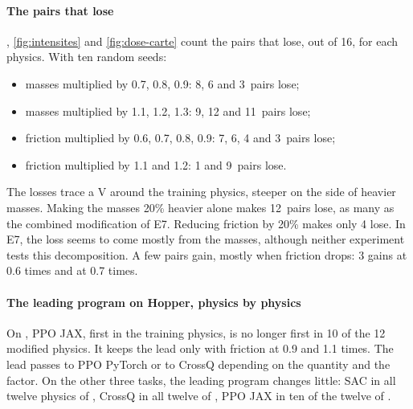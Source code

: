 \paragraph{The pairs that lose}
, \cref{fig:intensites} and \cref{fig:dose-carte} count the pairs that lose, out of 16, for each
physics. With ten random seeds:
\begin{itemize}
  \item masses multiplied by 0.7, 0.8, 0.9: 8, 6 and 3~pairs lose;
  \item masses multiplied by 1.1, 1.2, 1.3: 9, 12 and 11~pairs lose;
  \item friction multiplied by 0.6, 0.7, 0.8, 0.9: 7, 6, 4 and 3~pairs lose;
  \item friction multiplied by 1.1 and 1.2: 1 and 9~pairs lose.
\end{itemize}
The losses trace a V around the training physics, steeper on the side of heavier masses. Making the masses
20\% heavier alone makes 12~pairs lose, as many as the combined modification of E7. Reducing friction by 20\%
makes only 4 lose. In E7, the loss seems to come mostly from the masses, although neither experiment tests
this decomposition. A few pairs gain, mostly when friction drops: 3 gains at 0.6 times and at 0.7 times.




\paragraph{The leading program on Hopper, physics by physics}
On , PPO JAX, first in the training physics, is no longer first in 10 of the 12 modified physics.
It keeps the lead only with friction at 0.9 and 1.1 times. The lead passes to PPO PyTorch or to CrossQ
depending on the quantity and the factor. On the other three tasks, the leading program changes little: SAC in
all twelve physics of , CrossQ in all twelve of , PPO JAX in ten of the twelve
of .

